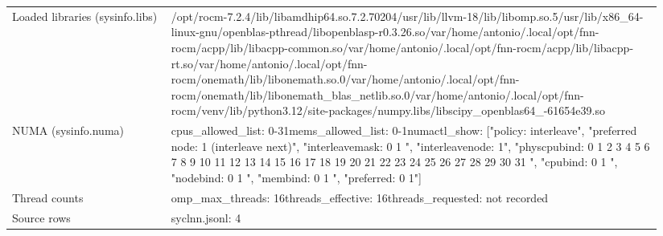 \begin{longtable}{>{\raggedright\arraybackslash}p{0.23\linewidth}>{\raggedright\arraybackslash}p{0.71\linewidth}}
Loaded libraries (sysinfo.libs) & /\allowbreak{}opt/\allowbreak{}rocm-7.2.4/\allowbreak{}lib/\allowbreak{}libamdhip64.so.7.2.70204\newline /\allowbreak{}usr/\allowbreak{}lib/\allowbreak{}llvm-18/\allowbreak{}lib/\allowbreak{}libomp.so.5\newline /\allowbreak{}usr/\allowbreak{}lib/\allowbreak{}x86\_\allowbreak{}64-linux-gnu/\allowbreak{}openblas-pthread/\allowbreak{}libopenblasp-r0.3.26.so\newline /\allowbreak{}var/\allowbreak{}home/\allowbreak{}antonio/\allowbreak{}.local/\allowbreak{}opt/\allowbreak{}fnn-rocm/\allowbreak{}acpp/\allowbreak{}lib/\allowbreak{}libacpp-common.so\newline /\allowbreak{}var/\allowbreak{}home/\allowbreak{}antonio/\allowbreak{}.local/\allowbreak{}opt/\allowbreak{}fnn-rocm/\allowbreak{}acpp/\allowbreak{}lib/\allowbreak{}libacpp-rt.so\newline /\allowbreak{}var/\allowbreak{}home/\allowbreak{}antonio/\allowbreak{}.local/\allowbreak{}opt/\allowbreak{}fnn-rocm/\allowbreak{}onemath/\allowbreak{}lib/\allowbreak{}libonemath.so.0\newline /\allowbreak{}var/\allowbreak{}home/\allowbreak{}antonio/\allowbreak{}.local/\allowbreak{}opt/\allowbreak{}fnn-rocm/\allowbreak{}onemath/\allowbreak{}lib/\allowbreak{}libonemath\_\allowbreak{}blas\_\allowbreak{}netlib.so.0\newline /\allowbreak{}var/\allowbreak{}home/\allowbreak{}antonio/\allowbreak{}.local/\allowbreak{}opt/\allowbreak{}fnn-rocm/\allowbreak{}venv/\allowbreak{}lib/\allowbreak{}python3.12/\allowbreak{}site-packages/\allowbreak{}numpy.libs/\allowbreak{}libscipy\_\allowbreak{}openblas64\_\allowbreak{}-61654e39.so \\
NUMA (sysinfo.numa) & cpus\_\allowbreak{}allowed\_\allowbreak{}list: 0-31\newline mems\_\allowbreak{}allowed\_\allowbreak{}list: 0-1\newline numactl\_\allowbreak{}show: ["policy: interleave", "preferred node: 1 (interleave next)", "interleavemask: 0 1 ", "interleavenode: 1", "physcpubind: 0 1 2 3 4 5 6 7 8 9 10 11 12 13 14 15 16 17 18 19 20 21 22 23 24 25 26 27 28 29 30 31 ", "cpubind: 0 1 ", "nodebind: 0 1 ", "membind: 0 1 ", "preferred: 0 1"] \\
Thread counts & omp\_\allowbreak{}max\_\allowbreak{}threads: 16\newline threads\_\allowbreak{}effective: 16\newline threads\_\allowbreak{}requested: not recorded \\
Source rows & syclnn.jsonl: 4 \\
\end{longtable}
